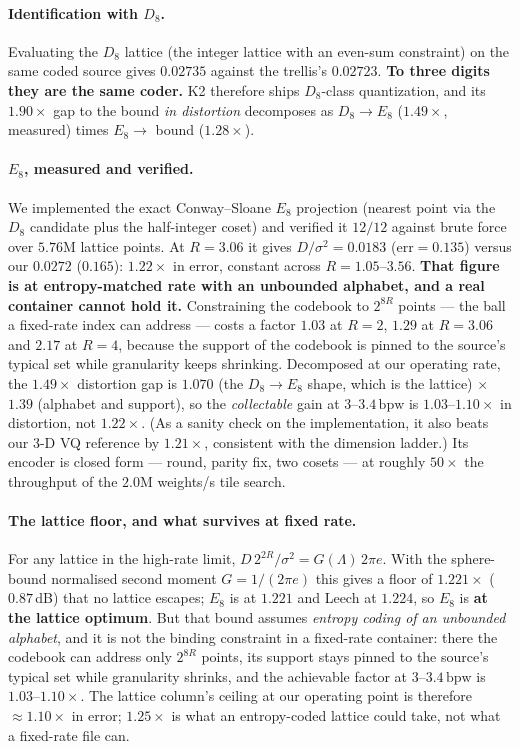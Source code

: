 \documentclass[11pt,a4paper]{article}
\newcommand{\bpw}{\,\mathrm{bpw}}
\begin{document}
\paragraph{Identification with $D_8$.} Evaluating the $D_8$ lattice (the integer lattice with an
even-sum constraint) on the same coded source gives $0.02735$ against the trellis's $0.02723$.
\textbf{To three digits they are the same coder.} K2 therefore ships $D_8$-class quantization, and its
$1.90\times$ gap to the bound \emph{in distortion} decomposes as $D_8\to E_8$ ($1.49\times$,
measured) times $E_8\to$ bound ($1.28\times$).

\paragraph{$E_8$, measured and verified.} We implemented the exact Conway--Sloane $E_8$
projection (nearest point via the $D_8$ candidate plus the half-integer coset) and verified it
$12/12$ against brute force over $5.76$M lattice points. At $R=3.06$ it gives
$D/\sigma^2=0.0183$ ($\mathrm{err}=0.135$) versus our $0.0272$ ($0.165$): $1.22\times$ in error,
constant across $R=1.05$--$3.56$. \textbf{That figure is at entropy-matched rate with an unbounded
alphabet, and a real container cannot hold it.} Constraining the codebook to $2^{8R}$ points --- the
ball a fixed-rate index can address --- costs a factor $1.03$ at $R=2$, $1.29$ at $R=3.06$ and
$2.17$ at $R=4$, because the support of the codebook is pinned to the source's typical set while
granularity keeps shrinking. Decomposed at our operating rate, the $1.49\times$ distortion gap is
$1.070$ (the $D_8\to E_8$ shape, which is the lattice) $\times$ $1.39$ (alphabet and support), so
the \emph{collectable} gain at $3$--$3.4\bpw$ is $1.03$--$1.10\times$ in distortion, not
$1.22\times$. (As a sanity check on the implementation, it also beats our 3-D VQ reference by
$1.21\times$, consistent with the dimension ladder.) Its encoder is closed form --- round, parity
fix, two cosets --- at roughly $50\times$ the throughput of the $2.0$M weights/s tile search.

\paragraph{The lattice floor, and what survives at fixed rate.} For any lattice in the high-rate
limit, $D\,2^{2R}/\sigma^2 = G(\Lambda)\,2\pi e$. With the sphere-bound normalised second moment
$G=1/(2\pi e)$ this gives a floor of $1.221\times$ ($0.87$\,dB) that no lattice escapes; $E_8$ is
at $1.221$ and Leech at $1.224$, so $E_8$ is \textbf{at the lattice optimum}. But that bound
assumes \emph{entropy coding of an unbounded alphabet}, and it is not the binding constraint in a
fixed-rate container: there the codebook can address only $2^{8R}$ points, its support stays pinned
to the source's typical set while granularity shrinks, and the achievable factor at $3$--$3.4\bpw$
is $1.03$--$1.10\times$. The lattice column's ceiling at our operating point is therefore
$\approx1.10\times$ in error; $1.25\times$ is what an entropy-coded lattice could take, not what
a fixed-rate file can.
\end{document}
